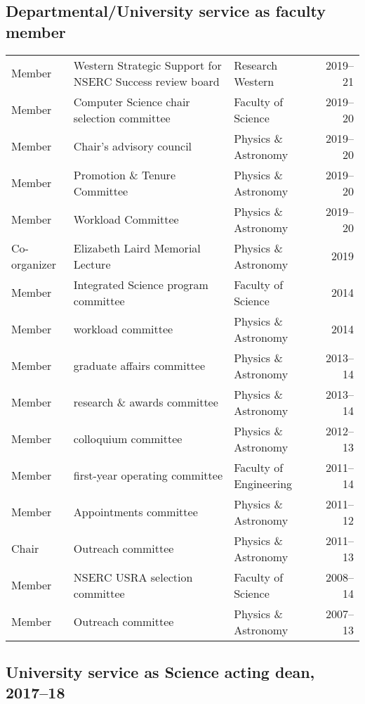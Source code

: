 \subsection{Departmental/University service as faculty member}

\begin{tabularx}{\textwidth}{lXXr}
Member&  Western Strategic Support for NSERC Success review board &  Research Western & 2019--21\\
Member& Computer Science chair selection committee&   Faculty of Science& 2019--20\\
Member& Chair's advisory council&   Physics \& Astronomy& 2019--20\\
Member& Promotion \& Tenure Committee &   Physics \& Astronomy& 2019--20\\
Member&Workload Committee &   Physics \& Astronomy& 2019--20\\
Co-organizer& Elizabeth Laird Memorial Lecture&  Physics \& Astronomy& 2019\\
Member& Integrated Science program committee&   Faculty of Science& 2014\\
Member& workload committee&  Physics \& Astronomy& 2014\\
Member& graduate affairs committee&   Physics \& Astronomy& 2013--14\\
Member& research \& awards committee&   Physics \& Astronomy& 2013--14\\
Member& colloquium committee&  Physics \& Astronomy& 2012--13\\
Member& first-year operating committee&  Faculty of Engineering &  2011--14\\
Member & Appointments committee&  Physics \& Astronomy& 2011--12\\
Chair& Outreach committee&  Physics \& Astronomy& 2011--13\\
Member&  NSERC USRA selection committee&  Faculty of Science& 2008--14\\
Member&  Outreach committee& Physics \& Astronomy& 2007--13\\
\end{tabularx}

\subsection{University service as Science acting dean, 2017--18}

